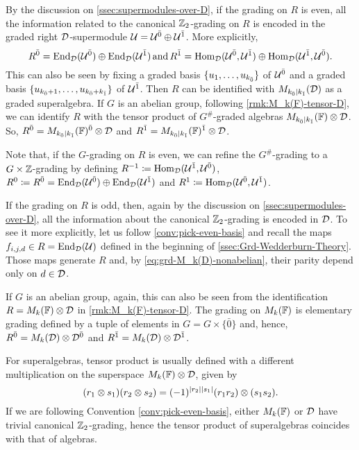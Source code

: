 By the discussion on \cref{ssec:supermodules-over-D}, if the grading on $R$ is even, all the information related to the canonical $\mathbb{Z}_2$-grading on $R$ is encoded in the graded right $\mathcal{D}$-supermodule $\mathcal U=\mathcal U^{\bar0} \oplus \mathcal U^{\bar1}$. 
More explicitly, 
\[\label{eq:almost-ZZ-grading}
    R^{\bar0} = \operatorname{End}_{\mathcal{D}}(\mathcal U^{\bar0}) \oplus \operatorname{End}_{\mathcal{D}}(\mathcal U^{\bar1}) \,\text{and}\, R^{\bar1} = \operatorname{Hom}_{\mathcal{D}}(\mathcal U^{\bar0}, \mathcal U^{\bar1}) \oplus \operatorname{Hom}_{\mathcal{D}}(\mathcal U^{\bar1}, \mathcal U^{\bar0}).
\]
This can also be seen by fixing a graded basis $\{u_1, \ldots, u_{k_{\bar{0}}}\}$ of $\mathcal U^{\bar0}$ and a graded basis $\{u_{k_{\bar{0}} + 1}, \ldots, u_{k_{\bar{0}} + k_{\bar{1}}}\}$ of $\mathcal U^{\bar1}$. 
Then $R$ can be identified with $M_{k_{\bar{0}} \mid k_{\bar{1}}}(\mathcal{D})$ as a graded superalgebra. 
If $G$ is an abelian group, following \cref{rmk:M_k(F)-tensor-D}, we can identify $R$ with the tensor product of $G^\#$-graded algebras $M_{k_{\bar{0}} \mid k_{\bar{1}}}(\mathbb{F})\otimes \mathcal{D}$. 
So, $R^{\bar0} = M_{k_{\bar{0}} \mid k_{\bar{1}}}(\mathbb{F})^{\bar0} \otimes \mathcal{D}$ and $R^{\bar1} = M_{k_{\bar{0}} \mid k_{\bar{1}}}(\mathbb{F})^{\bar1} \otimes \mathcal{D}$. 

\begin{remark}\label{rmk:even-ZZ-grading}
    Note that, if the $G$-grading on $R$ is even, we can refine the $G^\#$-grading to a $G\times \mathbb{Z}$-grading by defining $R^{-1} \coloneqq \operatorname{Hom}_{\mathcal{D}} (\mathcal U^{\bar1}, \mathcal U^{\bar0})$, $R^0 \coloneqq R^{\bar0} = \operatorname{End}_{\mathcal{D}}(\mathcal U^{\bar0}) \oplus \operatorname{End}_{\mathcal{D}}(\mathcal U^{\bar1})$ and $R^1 \coloneqq \operatorname{Hom}_{\mathcal{D}} (\mathcal U^{\bar0}, \mathcal U^{\bar1})$. 
\end{remark}

If the grading on $R$ is odd, then, again by the discussion on \cref{ssec:supermodules-over-D}, all the information about the canonical $\mathbb{Z}_2$-grading is encoded in $\mathcal{D}$. 
To see it more explicitly, let us follow \cref{conv:pick-even-basis} and recall the maps $f_{i, j, d} \in R = \operatorname{End}_{\mathcal{D}} (\mathcal U)$ defined in the beginning of \cref{ssec:Grd-Wedderburn-Theory}. 
Those maps generate $R$ and, by \cref{eq:grd-M_k(D)-nonabelian}, their parity depend only on $d \in \mathcal{D}$. 

If $G$ is an abelian group, again, this can also be seen from the identification $R = M_k(\mathbb{F})\otimes \mathcal{D}$ in \cref{rmk:M_k(F)-tensor-D}. 
The grading on $M_k(\mathbb{F})$ is elementary grading defined by a tuple of elements in $G = G \times \{ \bar 0 \}$ and, hence, $R^{\bar0} = M_k(\mathcal{D}) \otimes \mathcal{D}^{\bar0}$ and $R^{\bar1} = M_k(\mathcal{D}) \otimes \mathcal{D}^{\bar1}$. 

\begin{remark}\label{rmk:M(D)=M(FF)-tensor-D}
	For superalgebras, tensor product is usually defined with a different multiplication on the superspace $M_k(\mathbb{F})\otimes \mathcal{D}$, given by \[(r_1 \otimes s_1) (r_2 \otimes s_2) = (-1)^{|r_2||s_1|} (r_1 r_2) \otimes (s_1 s_2).\]
	If we are following Convention \ref{conv:pick-even-basis}, either $M_k(\mathbb{F})$ or $\mathcal{D}$ have trivial canonical $\mathbb{Z}_2$-grading, hence the tensor product of superalgebras coincides with that of algebras.
\end{remark}


